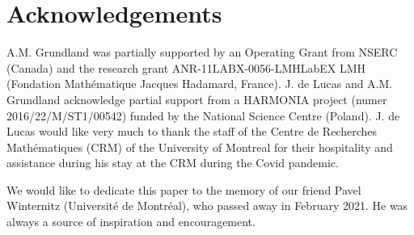 \documentclass{birkjour}
\theoremstyle{definition}
\theoremstyle{remark}
\numberwithin{equation}{section}
\numberwithin{equation}{section}
\numberwithin{thm}{section}
\numberwithin{equation}{section}
\numberwithin{thm}{section}
\begin{document}
\section{Acknowledgements}
A.M. Grundland was partially supported by an Operating Grant from NSERC (Canada) and the research grant ANR-11LABX-0056-LMHLabEX LMH (Fondation Math\'ematique Jacques Hadamard, France). J. de Lucas and A.M. Grundland acknowledge partial support from a HARMONIA  project (numer 2016/22/M/ST1/00542) funded by the National Science Centre (Poland). J. de Lucas would like very much to thank the staff of the Centre de Recherches Math\'ematiques (CRM) of the University of Montreal for their hospitality and assistance  during his stay at the CRM during the Covid pandemic. 

We would like to dedicate this paper to the memory of our friend Pavel Winternitz (Universit\'e de Montr\'eal), who passed away in February 2021. He  was always a source of inspiration and encouragement.
\end{document}
